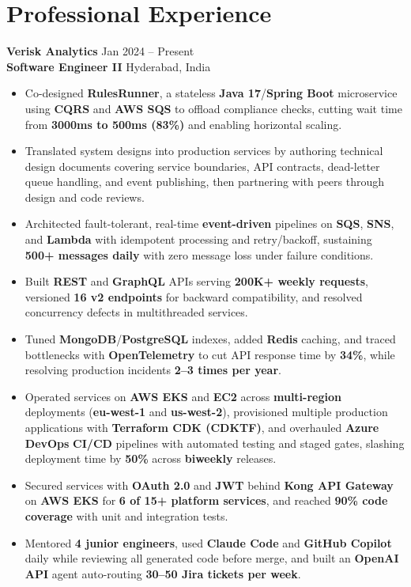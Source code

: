 \documentclass[a4paper,10pt]{article}
\begin{document}
\section*{Professional Experience}

\textbf{Verisk Analytics} \hfill Jan 2024 -- Present \\
\textbf{Software Engineer II} \hfill Hyderabad, India

\begin{itemize}[leftmargin=*]
    \item Co-designed \textbf{RulesRunner}, a stateless \textbf{Java 17}/\textbf{Spring Boot} microservice using \textbf{CQRS} and \textbf{AWS SQS} to offload compliance checks, cutting wait time from \textbf{3000ms to 500ms (83\%)} and enabling horizontal scaling.
    \item Translated system designs into production services by authoring technical design documents covering service boundaries, API contracts, dead-letter queue handling, and event publishing, then partnering with peers through design and code reviews.
    \item Architected fault-tolerant, real-time \textbf{event-driven} pipelines on \textbf{SQS}, \textbf{SNS}, and \textbf{Lambda} with idempotent processing and retry/backoff, sustaining \textbf{500+ messages daily} with zero message loss under failure conditions.
    \item Built \textbf{REST} and \textbf{GraphQL} APIs serving \textbf{200K+ weekly requests}, versioned \textbf{16 v2 endpoints} for backward compatibility, and resolved concurrency defects in multithreaded services.
    \item Tuned \textbf{MongoDB}/\textbf{PostgreSQL} indexes, added \textbf{Redis} caching, and traced bottlenecks with \textbf{OpenTelemetry} to cut API response time by \textbf{34\%}, while resolving production incidents \textbf{2--3 times per year}.
    \item Operated services on \textbf{AWS EKS} and \textbf{EC2} across \textbf{multi-region} deployments (\textbf{eu-west-1} and \textbf{us-west-2}), provisioned multiple production applications with \textbf{Terraform CDK (CDKTF)}, and overhauled \textbf{Azure DevOps} \textbf{CI/CD} pipelines with automated testing and staged gates, slashing deployment time by \textbf{50\%} across \textbf{biweekly} releases.
    \item Secured services with \textbf{OAuth 2.0} and \textbf{JWT} behind \textbf{Kong API Gateway} on \textbf{AWS EKS} for \textbf{6 of 15+ platform services}, and reached \textbf{90\% code coverage} with unit and integration tests.
    \item Mentored \textbf{4 junior engineers}, used \textbf{Claude Code} and \textbf{GitHub Copilot} daily while reviewing all generated code before merge, and built an \textbf{OpenAI API} agent auto-routing \textbf{30--50 Jira tickets per week}.
\end{itemize}
\end{document}
